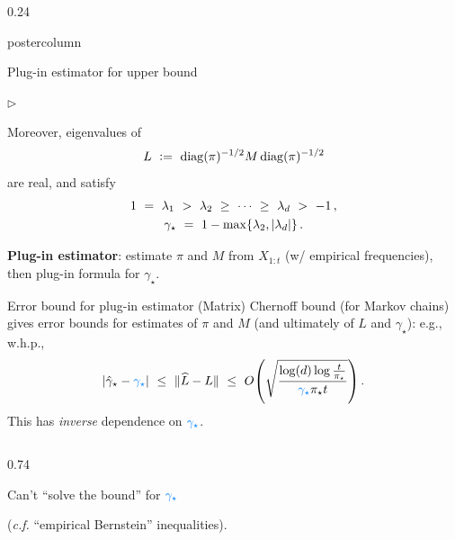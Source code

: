 \documentclass[notheorems,final]{beamer}
\newcommand{\AZURE}[1]{\textcolor{azure}{#1}}
\newcommand{\AWESOME}[1]{\textcolor{awesome}{#1}}
\newcommand\pimin{\ensuremath{\pi_{\star}}}
\newcommand\gap{\ensuremath{\gamma_{\star}}}
\newcommand\hatgap{\ensuremath{\hat{\gamma}_{\star}}}
\begin{document}
\begin{frame}{}
\begin{columns}
\begin{column}{0.24\textwidth}
\begin{beamercolorbox}[center,wd=\textwidth]{postercolumn}
\begin{minipage}[T]{.95\textwidth}
{\begin{block}{Plug-in estimator for upper bound}
\begin{list}{$\triangleright$}
                  \item
                    Moreover, eigenvalues of
                    \[
                      L
                      \ := \
                      \operatorname{diag}(\pi)^{-1/2} M \operatorname{diag}(\pi)^{-1/2}
                    \]
                    are real, and satisfy
                    \begin{gather*}
                      1
                      \ = \ \lambda_1 \ > \ \lambda_2 \ \geq \ \dotsb \ \geq \
                      \lambda_d \ > \ -1
                      \,,
                      \\
                      \gap
                      \ = \ 1 - \max\braces{ \lambda_2, \abs{\lambda_d} }
                      \,.
                    \end{gather*}

                  \item
                    \textbf{Plug-in estimator}:
                    estimate $\pi$ and $M$ from $X_{1:t}$ (w/ empirical
                    frequencies), then plug-in formula for $\gap$.

                \end{list}

              \end{block}

              \begin{block}{Error bound for plug-in estimator}
                (Matrix) Chernoff bound {\small(for Markov chains)}
                gives error bounds for estimates of $\pi$ and $M$ (and
                ultimately of $L$ and $\gap$): e.g., w.h.p.,
                \[
                  \abs{\hatgap-\AZURE{\gap}}
                  \ \leq \
                  \norm{\wh L - L}
                  \ \leq \
                  O\Parens{
                    \sqrt{\frac{\log(d)\log\frac{t}{\pimin}}{\AZURE{\gap}\pimin t}}
                  }
                  \,.
                \]
                This has \AWESOME{\emph{inverse} dependence} on
                $\AZURE{\gap}$.

                \begin{columns}
                  \begin{column}{0.74\textwidth}
                    \begin{center}
                      \AWESOME{%
                        Can't ``solve the bound'' for $\AZURE{\gap}$
                      }

                      {\small(\emph{c.f.} ``empirical Bernstein''
                      inequalities)}.


\end{center}
\end{column}
\end{columns}
\end{block}}
\end{minipage}
\end{beamercolorbox}
\end{column}
\end{columns}
\end{frame}
\end{document}
